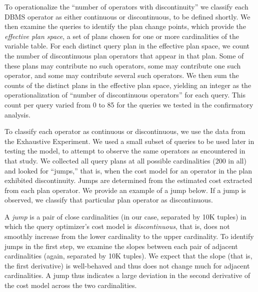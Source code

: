 \documentclass[prodmode,acmtods]{acmsmall}
\begin{document}
To operationalize the ``number of operators with discontinuity'' we
classify each \hbox{DBMS} operator as either continuous or discontinuous, to be
defined shortly.  We then examine the queries
to identify the plan change points, which provide the {\em effective plan
  space}, a set of plans chosen for one or
more cardinalities of the variable table. For each distinct query plan in the
effective plan space, we
count the number of discontinuous plan operators that appear in that plan. Some of
these plans may contribute no such operators, some may contribute one such
operator, and some may contribute several such operators. We then sum the
counts of the distinct plans in the effective plan space, yielding an
integer as the operationalization of ``number of discontinuous operators''
for each query.  This count per query varied from 0 to 85 for the
queries we tested in the confirmatory analysis.

To classify each operator as continuous or discontinuous, we use the data
from the Exhaustive Experiment. We
used a small subset of queries to be used later in testing the model, to
attempt to observe the same operators as encountered in that
study. We
collected all query plans at all possible cardinalities (200 in all) and
looked for ``jumps,'' that is, when the cost model for an operator in the
plan exhibited discontinuity. Jumps are determined from the estimated cost
extracted from each plan operator. We provide an example of a jump below. If
a jump is observed, we classify that particular plan operator as
discontinuous.

A {\em jump} is a pair of close cardinalities (in our case, separated by 10K
tuples) in which the query optimizer's cost model is {\em discontinuous},
that is, does not smoothly increase from the lower cardinality to the upper
cardinality. To identify jumps in the first step, we examine the slopes
between each pair of adjacent cardinalities (again, separated by 10K
tuples). We expect that the slope (that is, the first derivative) is
well-behaved and thus does not change much for adjacent cardinalities. 
A jump thus indicates a large deviation in the second derivative of the 
cost model across the two cardinalities.
\end{document}
